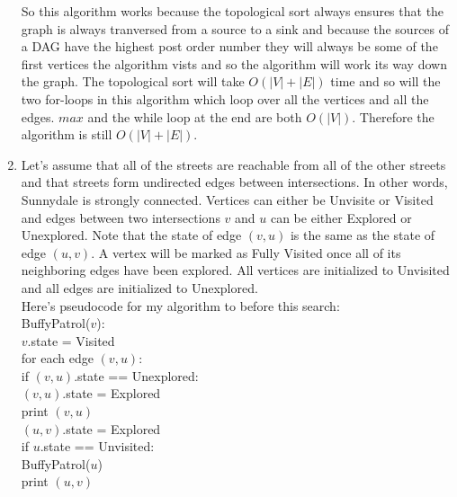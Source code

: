 \documentclass{article}
\begin{document}
\begin{enumerate}
	So this algorithm works because the topological sort always ensures that the graph is always tranversed from a source to a sink and because the sources of a DAG have the highest post order number they will always be some of the first vertices the algorithm vists and so the algorithm will work its way down the graph. The topological sort will take $O(|V|+|E|)$ time and so will the two for-loops in this algorithm which loop over all the vertices and all the edges.  $max$ and the while loop at the end are both $O(|V|)$.  Therefore the algorithm is still $O(|V|+|E|)$.   
	
	\item Let's assume that all of the streets are reachable from all of the other streets and that streets form undirected edges between intersections.  In other words, Sunnydale is strongly connected.  Vertices can either be Unvisite or Visited and edges between two intersections $v$ and $u$ can be either Explored or Unexplored.  Note that the state of edge $(v,u)$ is the same as the state of edge $(u,v)$.  A vertex will be marked as Fully Visited once all of its neighboring edges have been explored.  All vertices are initialized to Unvisited and all edges are initialized to Unexplored.  \\
	Here's pseudocode for my algorithm to before this search: \\
	BuffyPatrol($v$):\\
	 \hspace*{0.5 in} $v$.state = Visited \\
	 \hspace*{0.5 in} for each edge $(v,u)$: \\
	 \hspace*{1.0 in} 	if $(v,u)$.state == Unexplored: \\
	 \hspace*{1.5 in}			$(v,u)$.state = Explored  \\
	 \hspace*{1.5 in}			print $(v,u)$ \\
	 \hspace*{1.5 in}			$(u,v)$.state = Explored \\
	 \hspace*{1.5 in}			if $u$.state == Unvisited: \\
	 \hspace*{2.0 in}				BuffyPatrol($u$) \\
	 \hspace*{1.5 in}			print $(u,v)$ \\
	 \\

\end{enumerate}
\end{document}

